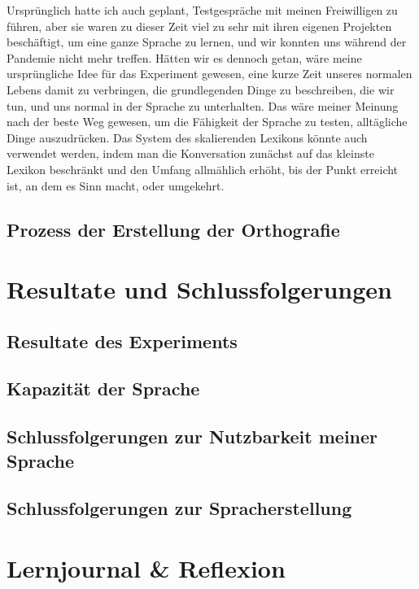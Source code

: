 \documentclass{article}
\begin{document}
Ursprünglich hatte ich auch geplant, Testgespräche mit meinen Freiwilligen zu führen,
aber sie waren zu dieser Zeit viel zu sehr mit ihren eigenen Projekten beschäftigt, um eine ganze Sprache zu lernen,
und wir konnten uns während der Pandemie nicht mehr treffen. Hätten wir es dennoch getan, wäre meine ursprüngliche
Idee für das Experiment gewesen, eine kurze Zeit unseres normalen Lebens damit zu verbringen,
die grundlegenden Dinge zu beschreiben, die wir tun, und uns normal in der Sprache zu unterhalten.
Das wäre meiner Meinung nach der beste Weg gewesen, um die Fähigkeit der Sprache zu testen, alltägliche Dinge auszudrücken.
Das System des skalierenden Lexikons könnte auch verwendet werden, indem man die Konversation zunächst auf das kleinste
Lexikon beschränkt und den Umfang allmählich erhöht, bis der Punkt erreicht ist, an dem es Sinn macht, oder umgekehrt.

\subsection{Prozess der Erstellung der Orthografie}




\section{Resultate und Schlussfolgerungen}
\subsection{Resultate des Experiments}


\subsection{Kapazität der Sprache}


\subsection{Schlussfolgerungen zur Nutzbarkeit meiner Sprache}


\subsection{Schlussfolgerungen zur Spracherstellung}




\section{Lernjournal \& Reflexion}
\end{document}
